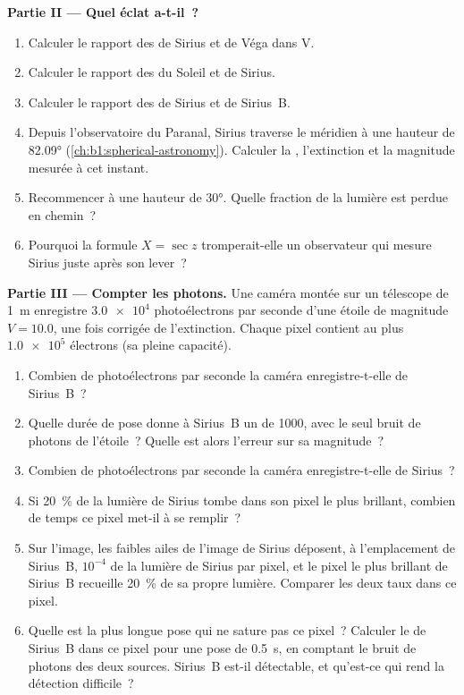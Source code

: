 \begin{problem}
\medskip
\noindent\textbf{Partie II --- Quel éclat a-t-il~?}
\begin{enumerate}[resume]
  \item Calculer le rapport des  de Sirius et de Véga dans V.
  \item Calculer le rapport des  du Soleil et de Sirius.
  \item Calculer le rapport des  de Sirius et de Sirius~B.
  \item Depuis l'observatoire du Paranal, Sirius traverse le méridien à une
        hauteur de \ang{82.09} (\cref{ch:b1:spherical-astronomy}). Calculer
        la , l'extinction et la magnitude mesurée à cet instant.
  \item Recommencer à une hauteur de \ang{30}. Quelle fraction de la lumière
        est perdue en chemin~?
  \item Pourquoi la formule $X = \sec z$ tromperait-elle un observateur qui
        mesure Sirius juste après son lever~?
\end{enumerate}

\medskip
\noindent\textbf{Partie III --- Compter les photons.}
Une caméra montée sur un télescope de \qty{1}{m} enregistre $\num{3.0e4}$
photoélectrons par seconde d'une étoile de magnitude $V = 10.0$, une fois
corrigée de l'extinction. Chaque pixel contient au plus $\num{1.0e5}$ électrons
(sa pleine capacité).
\begin{enumerate}[resume]
  \item Combien de photoélectrons par seconde la caméra enregistre-t-elle de
        Sirius~B~?
  \item Quelle durée de pose donne à Sirius~B un  de
        1000, avec le seul bruit de photons de l'étoile~? Quelle est alors
        l'erreur sur sa magnitude~?
  \item Combien de photoélectrons par seconde la caméra enregistre-t-elle de
        Sirius~?
  \item Si \qty{20}{\percent} de la lumière de Sirius tombe dans son pixel le
        plus brillant, combien de temps ce pixel met-il à se remplir~?
  \item Sur l'image, les faibles ailes de l'image de Sirius déposent, à
        l'emplacement de Sirius~B, $10^{-4}$ de la lumière de Sirius par pixel,
        et le pixel le plus brillant de Sirius~B recueille \qty{20}{\percent} de
        sa propre lumière. Comparer les deux taux dans ce pixel.
  \item Quelle est la plus longue pose qui ne sature pas ce pixel~? Calculer le
         de Sirius~B dans ce pixel pour une pose de
        \qty{0.5}{s}, en comptant le bruit de photons des deux sources. Sirius~B
        est-il détectable, et qu'est-ce qui rend la détection difficile~?
\end{enumerate}


\end{problem}
